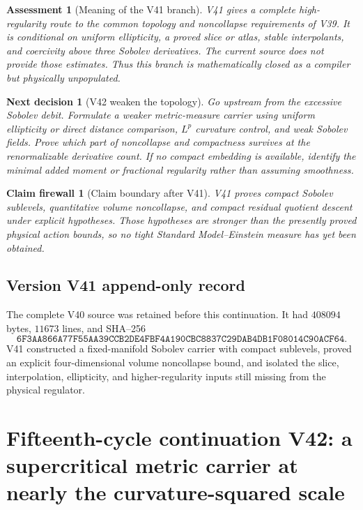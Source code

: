 \documentclass[11pt]{article}
\newtheorem{firewall}[theorem]{Claim firewall}
\newtheorem{decision}[theorem]{Next decision}
\newtheorem{assessment}[theorem]{Assessment}
\theoremstyle{remark}
\begin{document}
\begin{assessment}[Meaning of the V41 branch]
\label{ass:v15v41-meaning}
V41 gives a complete high-regularity route to the common topology
and noncollapse requirements of V39.  It is conditional on uniform
ellipticity, a proved slice or atlas, stable interpolants, and
coercivity above three Sobolev derivatives.  The current source does
not provide those estimates.  Thus this branch is mathematically
closed as a compiler but physically unpopulated.
\end{assessment}

\begin{decision}[V42 weaken the topology]
\label{dec:v15v41-next}
Go upstream from the excessive Sobolev debit.  Formulate a weaker
metric-measure carrier using uniform ellipticity or direct distance
comparison, \(L^p\) curvature control, and weak Sobolev fields.
Prove which part of noncollapse and compactness survives at the
renormalizable derivative count.  If no compact embedding is
available, identify the minimal added moment or fractional
regularity rather than assuming smoothness.
\end{decision}

\begin{firewall}[Claim boundary after V41]
\label{fire:v15v41}
V41 proves compact Sobolev sublevels, quantitative volume
noncollapse, and compact residual quotient descent under explicit
hypotheses.  Those hypotheses are stronger than the presently
proved physical action bounds, so no tight Standard Model--Einstein
measure has yet been obtained.
\end{firewall}

\section*{Version V41 append-only record}
The complete V40 source was retained before this continuation.  It
had \(408094\) bytes, \(11673\) lines, and SHA--256
\[
 \texttt{6F3AA866A77F55AA39CCB2DE4FBF4A190CBC8837C29DAB4DB1F08014C90ACF64}.
\]
V41 constructed a fixed-manifold Sobolev carrier with compact
sublevels, proved an explicit four-dimensional volume noncollapse
bound, and isolated the slice, interpolation, ellipticity, and
higher-regularity inputs still missing from the physical regulator.

\chapter{Fifteenth-cycle continuation V42: a supercritical metric carrier at nearly the curvature-squared scale}
\label{sec:v15v42}
\end{document}
